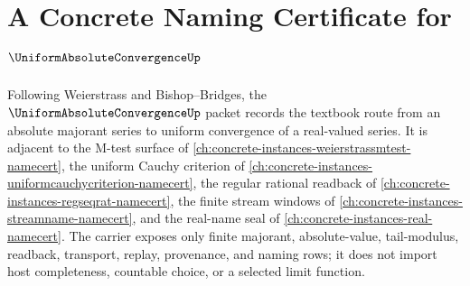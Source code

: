 \chapter{A Concrete Naming Certificate for $\UniformAbsoluteConvergenceUp$}
\label{ch:concrete-instances-uniform-absolute-convergence-namecert}

Following Weierstrass and Bishop--Bridges, the $\UniformAbsoluteConvergenceUp$ packet records the textbook route from an absolute majorant series to uniform convergence of a real-valued series. It is adjacent to the M-test surface of \autoref{ch:concrete-instances-weierstrassmtest-namecert}, the uniform Cauchy criterion of \autoref{ch:concrete-instances-uniformcauchycriterion-namecert}, the regular rational readback of \autoref{ch:concrete-instances-regseqrat-namecert}, the finite stream windows of \autoref{ch:concrete-instances-streamname-namecert}, and the real-name seal of \autoref{ch:concrete-instances-real-namecert}. The carrier exposes only finite majorant, absolute-value, tail-modulus, readback, transport, replay, provenance, and naming rows; it does not import host completeness, countable choice, or a selected limit function.

